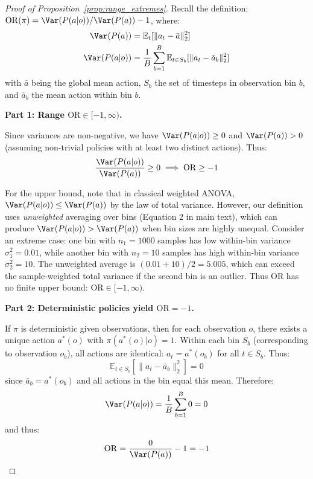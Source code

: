 \begin{proof}[Proof of Proposition~\ref{prop:range_extremes}]
Recall the definition: $\mathrm{OR}(\pi) = \Var(P(a|o)) / \Var(P(a)) - 1$, where:
\begin{align}
\Var(P(a)) &= \mathbb{E}_t[\|a_t - \bar{a}\|_2^2] \\
\Var(P(a|o)) &= \frac{1}{B} \sum_{b=1}^{B} \mathbb{E}_{t \in S_b}[\|a_t - \bar{a}_b\|_2^2]
\end{align}
with $\bar{a}$ being the global mean action, $S_b$ the set of timesteps in observation bin $b$, and $\bar{a}_b$ the mean action within bin $b$.

\textbf{Part 1: Range $\mathrm{OR} \in [-1, \infty)$.}

Since variances are non-negative, we have $\Var(P(a|o)) \geq 0$ and $\Var(P(a)) > 0$ (assuming non-trivial policies with at least two distinct actions). Thus:
\begin{equation}
\frac{\Var(P(a|o))}{\Var(P(a))} \geq 0 \implies \mathrm{OR} \geq -1
\end{equation}

For the upper bound, note that in classical weighted ANOVA, $\Var(P(a|o)) \leq \Var(P(a))$ by the law of total variance. However, our definition uses \emph{unweighted} averaging over bins (Equation 2 in main text), which can produce $\Var(P(a|o)) > \Var(P(a))$ when bin sizes are highly unequal. Consider an extreme case: one bin with $n_1 = 1000$ samples has low within-bin variance $\sigma_1^2 = 0.01$, while another bin with $n_2 = 10$ samples has high within-bin variance $\sigma_2^2 = 10$. The unweighted average is $(0.01 + 10)/2 = 5.005$, which can exceed the sample-weighted total variance if the second bin is an outlier. Thus $\mathrm{OR}$ has no finite upper bound: $\mathrm{OR} \in [-1, \infty)$.

\textbf{Part 2: Deterministic policies yield $\mathrm{OR} = -1$.}

If $\pi$ is deterministic given observations, then for each observation $o$, there exists a unique action $a^*(o)$ with $\pi(a^*(o)|o) = 1$. Within each bin $S_b$ (corresponding to observation $o_b$), all actions are identical: $a_t = a^*(o_b)$ for all $t \in S_b$. Thus:
\begin{equation}
\mathbb{E}_{t \in S_b}[\|a_t - \bar{a}_b\|_2^2] = 0
\end{equation}
since $\bar{a}_b = a^*(o_b)$ and all actions in the bin equal this mean. Therefore:
\begin{equation}
\Var(P(a|o)) = \frac{1}{B} \sum_{b=1}^{B} 0 = 0
\end{equation}
and thus:
\begin{equation}
\mathrm{OR} = \frac{0}{\Var(P(a))} - 1 = -1
\end{equation}


\end{proof}
